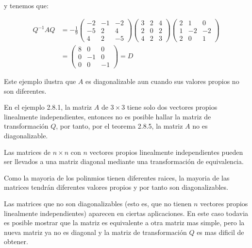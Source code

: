 \begin{ejemplo}
			y tenemos que:

			\begin{align*}
				Q^{-1} A Q &= -\frac{1}{9}
				\begin{pmatrix}
					-2 & -1 & -2 \\
					-5 & 2 & 4 \\
					4 & 2 & -5
				\end{pmatrix}
				\begin{pmatrix}
					3 & 2 & 4 \\
					2 & 0 & 2 \\
					4 & 2 & 3
				\end{pmatrix}
				\begin{pmatrix}
					2 & 1 & 0 \\
					1 & -2 & -2 \\
					2 & 0 & 1
				\end{pmatrix} \\
				&=
				\begin{pmatrix}
					8 & 0 & 0 \\
					0 & -1 & 0 \\
					0 & 0 & -1
				\end{pmatrix} = D
			\end{align*}

			Este ejemplo ilustra que $A$ es diagonalizable aun cuando sus valores propios no son diferentes.
		\end{ejemplo}

		\begin{ejemplo}
			En el ejemplo 2.8.1, la matriz $A$ de $3 \times 3$ tiene solo dos vectores propios linealmente independientes, entonces no es posible hallar la matriz de transformación $Q$, por tanto, por el teorema 2.8.5, la matriz $A$ no es diagonalizable.

			Las matrices de $n \times n$ con $n$ vectores propios linealmente independientes pueden ser llevados a una matriz diagonal mediante una transformación de equivalencia.

			Como la mayoria de los polinmios  tienen diferentes raices, la mayoria de las matrices tendrán diferentes valores propios y por tanto son diagonalizables.

			Las matrices que no son diagonalizables (esto es, que no tienen $n$ vectores propios linealmente independientes) aparecen en ciertas aplicaciones. En este caso todavia es posible mostrar que la matriz es equivalente a otra matriz mas simple, pero la nueva matriz ya no es diagonal y la matriz de transformación $Q$ es mas dificil de obtener.
		\end{ejemplo}

